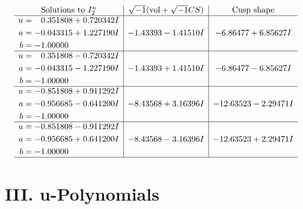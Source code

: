 \documentclass[1p]{elsarticle_modified}
\theoremstyle{definition}
\newcommand{\I}{\sqrt{-1}}
\begin{document}
$$\begin{array}{c|c|c}  
\text{Solutions to }I^u_{2}& \I (\text{vol} + \sqrt{-1}CS) & \text{Cusp shape}\\
 \hline 
\begin{aligned}
u &= \phantom{-}0.351808 + 0.720342 I \\
a &= -0.043315 + 1.227190 I \\
b &= -1.00000\phantom{ +0.000000I}\end{aligned}
 & -1.43393 - 1.41510 I & -6.86477 + 6.85627 I \\ \hline\begin{aligned}
u &= \phantom{-}0.351808 - 0.720342 I \\
a &= -0.043315 - 1.227190 I \\
b &= -1.00000\phantom{ +0.000000I}\end{aligned}
 & -1.43393 + 1.41510 I & -6.86477 - 6.85627 I \\ \hline\begin{aligned}
u &= -0.851808 + 0.911292 I \\
a &= -0.956685 - 0.641200 I \\
b &= -1.00000\phantom{ +0.000000I}\end{aligned}
 & -8.43568 + 3.16396 I & -12.63523 - 2.29471 I \\ \hline\begin{aligned}
u &= -0.851808 - 0.911292 I \\
a &= -0.956685 + 0.641200 I \\
b &= -1.00000\phantom{ +0.000000I}\end{aligned}
 & -8.43568 - 3.16396 I & -12.63523 + 2.29471 I\\
 \hline 
 \end{array}$$\newpage
\newpage\renewcommand{\arraystretch}{1}
\centering \section*{ III. u-Polynomials}
\end{document}
